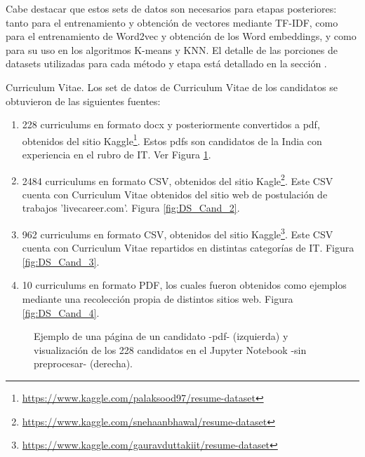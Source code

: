 \documentclass[12pt,a4paper]{article}
\makeatletter
\renewcommand\paragraph{\@startsection{paragraph}{4}{\z@}
            {-2.5ex\@plus -1ex \@minus -.25ex}
            {1.25ex \@plus .25ex}
            {\normalfont\normalsize\bfseries}}
\makeatother
\begin{document}
\begin{sloppypar}
Cabe destacar que estos sets de datos son necesarios para etapas posteriores: tanto para el entrenamiento y obtención de vectores mediante TF-IDF, como para el entrenamiento de Word2vec y obtención de los Word embeddings, y como para su uso en los algoritmos K-means y KNN. El detalle de las porciones de datasets utilizadas para cada método y etapa está detallado en la sección \textit{}.

\cleardoublepage

\paragraph{Curriculum Vitae.}\label{cvs}
Los set de datos de Curriculum Vitae de los candidatos se obtuvieron de las siguientes fuentes:

\begin{enumerate}
\item 228 curriculums en formato docx y posteriormente convertidos a pdf, obtenidos del sitio Kaggle\footnote{\url{https://www.kaggle.com/palaksood97/resume-dataset}}. Estos pdfs son candidatos de la India con experiencia en el rubro de IT. Ver Figura \ref{fig:DS_Cand_1}.
\item 2484 curriculums en formato CSV, obtenidos del sitio Kagle\footnote{\url{https://www.kaggle.com/snehaanbhawal/resume-dataset}}. Este CSV cuenta con Curriculum Vitae obtenidos del sitio web de postulación de trabajos 'livecareer.com'. Figura \ref{fig:DS_Cand_2}.
\item 962 curriculums en formato CSV, obtenidos del sitio Kaggle\footnote{\url{https://www.kaggle.com/gauravduttakiit/resume-dataset}}. Este CSV cuenta con Curriculum Vitae repartidos en distintas categorías de IT. Figura \ref{fig:DS_Cand_3}.
\item 10 curriculums en formato PDF, los cuales fueron obtenidos como ejemplos mediante una recolección propia de distintos sitios web. Figura \ref{fig:DS_Cand_4}.
\end{enumerate}

\begin{figure}[H] 
 \centering
 \noindent{}
 \caption{Ejemplo de una página de un candidato -pdf- (izquierda) y visualización de los 228 candidatos en el Jupyter Notebook -sin preprocesar- (derecha).} 
 \label{fig:DS_Cand_1}
\end{figure}


\end{sloppypar}
\end{document}
